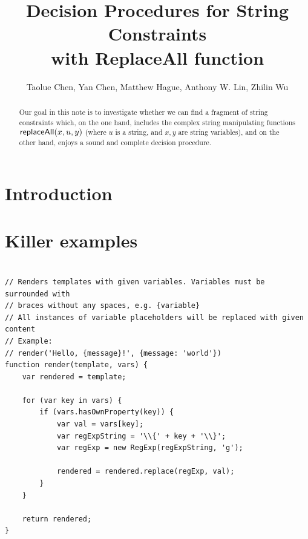 \documentclass{llncs}
\title{Decision Procedures for String Constraints \\
with ReplaceAll function}
\author{}
\institute{}
\author{Taolue Chen, Yan Chen, Matthew Hague, Anthony W. Lin, Zhilin Wu}
\begin{document}
\maketitle


\begin{abstract}
Our goal in this note is to investigate whether we can find a fragment of string constraints which, on the one hand, includes the complex string manipulating functions $\mathsf{replaceAll}(x, u, y)$ (where $u$ is a string, and $x,y$ are string variables), and on the other hand, enjoys a sound and complete decision procedure.
\end{abstract}

\newcommand{\concat} {\circ}

\newcommand{\replace} {{\sf replace}}

\newcommand{\str} {{\sf Str}}

\newcommand{\intnum} {{\sf Int}}

\newcommand{\regexp} {{\sf RegExp}}

\newcommand{\strarr} {{\sf StringArray}}

\newcommand{\dtypes} {{\sf DataTypes}}

\newcommand{\anarr} {{\mathbb{A}}}

\section{Introduction}

\cite{LB16,TCJ16,YABI14}

\section{Killer examples}


\begin{verbatim}

// Renders templates with given variables. Variables must be surrounded with
// braces without any spaces, e.g. {variable}
// All instances of variable placeholders will be replaced with given content
// Example:
// render('Hello, {message}!', {message: 'world'})
function render(template, vars) {
    var rendered = template;

    for (var key in vars) {
        if (vars.hasOwnProperty(key)) {
            var val = vars[key];
            var regExpString = '\\{' + key + '\\}';
            var regExp = new RegExp(regExpString, 'g');

            rendered = rendered.replace(regExp, val);
        }
    }

    return rendered;
}
\end{verbatim}
\end{document}
